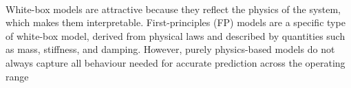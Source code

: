 %
\\
White-box models are attractive because they reflect the physics of the
system, which makes them interpretable.
First-principles (FP) models are a specific type of white-box model,
derived from physical laws and described by quantities such as mass,
stiffness, and damping.
However, purely physics-based models do not always capture all behaviour
needed for accurate prediction across the operating range
